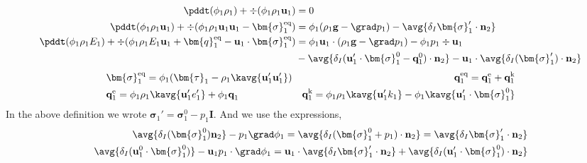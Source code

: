 \begin{align}
    \label{eq:dt_&vg_rho}
    \pddt (\phi_1 \rho_1)  
    + \div (
        \phi_1 \rho_1\textbf{u}_1
    )
    &= 
    0\\
    \label{eq:dt_&vg_rhou_1}
    \pddt (\phi_1 \rho_1\textbf{u}_1)  
    + \div (
        \phi_1 \rho_1\textbf{u}_1\textbf{u}_1
        - \bm{\sigma}_1^\text{eq}
    )
    &= 
    \phi_1  (\rho_1\textbf{g} - \grad p_1 )
    -  \avg{\delta_I \bm{\sigma}_1' \cdot \textbf{n}_2}\\
    \label{eq:dt_&vg_rhoE_1}
    \pddt (\phi_1\rho_1E_1)  
    + \div (
        \phi_1\rho_1E_1\textbf{u}_1
        + \bm{q}_1^\text{eq}
        - \textbf{u}_1 \cdot \bm{\sigma}_1^\text{eq}
        )
    &= 
    \phi_1 \textbf{u}_1 \cdot (\rho_1\textbf{g}
    - \grad p_1 
    )
    - \phi_1 p_1 \div \textbf{u}_1\\
    &- \avg{\delta_I (\textbf{u}_1' \cdot \bm{\sigma}_1^0 
    - \textbf{q}_1^0)\cdot \textbf{n}_2}
    - \textbf{u}_1 \cdot \avg{\delta_I ( \bm{\sigma}_1')\cdot \textbf{n}_2}
\end{align} 
\begin{align*}
    &\bm{\sigma}_1^\text{eq}
    = \phi_1 (
        \bm{\tau}_1%
        - \rho_1\kavg{\textbf{u}_1'\textbf{u}_1'})  
    &\textbf{q}_1^\text{eq}
    =\textbf{q}_1^\text{e} 
    +\textbf{q}_1^\text{k}  \\
    &\textbf{q}_1^\text{e}
    = \phi_1\rho_1 \kavg{\textbf{u}_1' e_1'} 
    + \phi_1\textbf{q}_1 
    &\textbf{q}_1^\text{k}
    = \phi_1\rho_1 \kavg{\textbf{u}_1' k_1} 
    - \phi_1\kavg{\textbf{u}_1' \cdot \bm{\sigma}_1^0}
\end{align*}
In the above definition we wrote $\bm{\sigma}_1' =\bm{\sigma}_1^0 - p_1 \textbf{I}$. And we use the expressions, 
\begin{align*}
    \avg{\delta_I (\bm{\sigma}_1^0 ) \textbf{n}_2} - p_1 \grad \phi_1
    = 
    \avg{\delta_I (\bm{\sigma}_1^0 + p_1)\cdot \textbf{n}_2}
    = 
    \avg{\delta_I \bm{\sigma}_1'\cdot \textbf{n}_2}
    \\
    \avg{\delta_I (\textbf{u}_1^0 \cdot\bm{\sigma}_1^0 )} - \textbf{u}_1p_1\cdot \grad \phi_1
    = \textbf{u}_1 \cdot \avg{\delta_I \bm{\sigma}_1'\cdot \textbf{n}_2}
    + \avg{\delta_I (\textbf{u}_1' \cdot \bm{\sigma}_1^0 )\cdot \textbf{n}_2}
\end{align*}
